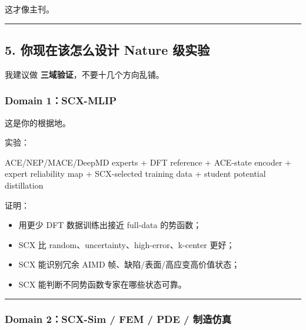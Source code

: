 \documentclass[
  12pt,
]{ctexart}
\newenvironment{Shaded}{}{}
\newcommand{\NormalTok}[1]{#1}
\providecommand{\tightlist}{%
  \setlength{\itemsep}{0pt}\setlength{\parskip}{0pt}}
\begin{document}
这才像主刊。

\begin{center}\rule{0.5\linewidth}{0.5pt}\end{center}

\subsection{5. 你现在该怎么设计 Nature
级实验}\label{ux4f60ux73b0ux5728ux8be5ux600eux4e48ux8bbeux8ba1-nature-ux7ea7ux5b9eux9a8c}

我建议做 \textbf{三域验证}，不要十几个方向乱铺。

\subsubsection{Domain 1：SCX-MLIP}\label{domain-1scx-mlip}

这是你的根据地。

实验：

\begin{Shaded}
\begin{Highlighting}[]
\NormalTok{ACE/NEP/MACE/DeepMD experts}
\NormalTok{+ DFT reference}
\NormalTok{+ ACE{-}state encoder}
\NormalTok{+ expert reliability map}
\NormalTok{+ SCX{-}selected training data}
\NormalTok{+ student potential distillation}
\end{Highlighting}
\end{Shaded}

证明：

\begin{itemize}
\tightlist
\item
  用更少 DFT 数据训练出接近 full-data 的势函数；
\item
  SCX 比 random、uncertainty、high-error、k-center 更好；
\item
  SCX 能识别冗余 AIMD 帧、缺陷/表面/高应变高价值状态；
\item
  SCX 能判断不同势函数专家在哪些状态可靠。
\end{itemize}

\begin{center}\rule{0.5\linewidth}{0.5pt}\end{center}

\subsubsection{Domain 2：SCX-Sim / FEM / PDE /
制造仿真}\label{domain-2scx-sim-fem-pde-ux5236ux9020ux4effux771f}
\end{document}
